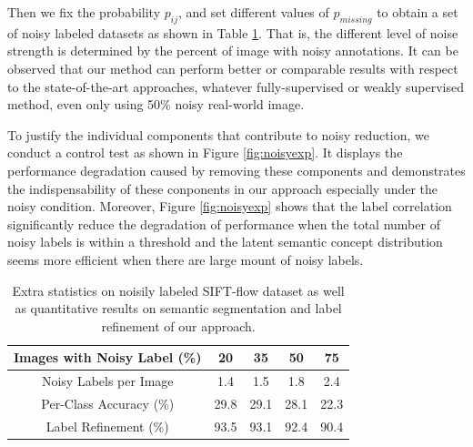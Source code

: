 Then we fix the probability $p_{ij}$, and set different values of $p_{missing}$ to obtain a set of noisy labeled datasets as shown in Table \ref{tab:ExpNoise}. That is, the different level of noise strength is determined by the percent of image with noisy annotations. It can be observed that our method can perform better or comparable results with respect to the state-of-the-art approaches, whatever fully-supervised or weakly supervised method, even only using 50\% noisy real-world image.

To justify the individual components that contribute to noisy reduction, we conduct a control test as shown in Figure \ref{fig:noisyexp}. It displays the performance degradation caused by removing these components and demonstrates the indispensability of these conponents in our approach especially under the noisy condition. Moreover, Figure \ref{fig:noisyexp} shows that the label correlation significantly reduce the degradation of performance when the total number of noisy labels is within a threshold and the latent semantic concept distribution seems more efficient when there are large mount of noisy labels.

\begin{table}[htb]
\begin{center}
\begin{tabular}{|c|c|c|c|c|}
\hline
Images with Noisy Label (\%) & 20 & 35 & 50 & 75 \\
\hline
Noisy Labels per Image & 1.4 & 1.5 & 1.8 & 2.4 \\
\hline
Per-Class Accuracy (\%) & 29.8 & 29.1 & 28.1 & 22.3 \\
\hline
Label Refinement (\%) & 93.5 & 93.1 & 92.4 & 90.4 \\
\hline
\end{tabular}
\end{center}
\caption{Extra statistics on noisily labeled SIFT-flow dataset as well as quantitative results on semantic segmentation and label refinement of our approach.}
\label{tab:ExpNoise}
\end{table}


